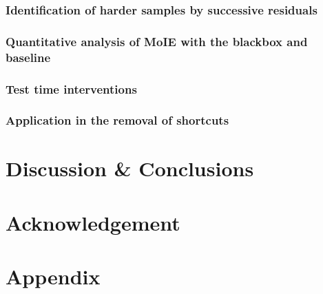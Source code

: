 \documentclass[nohyperref]{article}
\theoremstyle{plain}
\theoremstyle{definition}
\theoremstyle{remark}
\begin{document}
\subsubsection{Identification of harder samples by successive residuals}
\label{Sec:residual}



\subsubsection{Quantitative analysis of MoIE with the blackbox and baseline}


\subsubsection{Test time interventions}


\subsubsection{Application in the removal of shortcuts}




\section{Discussion \& Conclusions}


\section{Acknowledgement}







\newpage
\appendix
\onecolumn
\section{Appendix}
\end{document}
